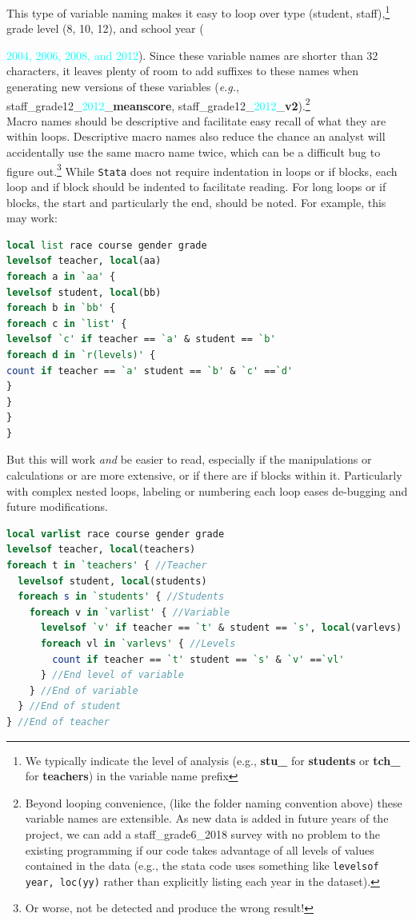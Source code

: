 \documentclass[11pt]{article}
\begin{document}
This type of  variable naming makes it easy to loop over type ({\textcolor{uscred}{student}}, {\textcolor{uscgold}{staff}}),\footnote{We typically indicate the level of analysis (e.g., \textcolor{uscred}{\textbf{stu\_}} for \textcolor{uscred}{\textbf{students}} or \textcolor{uscgold}{\textbf{tch\_}} for \textcolor{uscgold}{\textbf{teachers}}) in the variable name prefix} grade level (8, 10, 12), and school year ({\textcolor{cyan}{2004, 2006, 2008, and 2012}).  Since these variable names are shorter than 32 characters, it leaves plenty of room to add suffixes to these names when generating new versions of these variables (\textit{e.g.}, {\textcolor{uscgold}{\textsf{staff}}}\_grade12\_{\textcolor{cyan}{2012}}\_\textbf{meanscore},  {\textcolor{uscgold}{\textsf{staff}}}\_grade12\_{\textcolor{cyan}{2012}}\_\textbf{v2}).\footnote{Beyond looping convenience, (like the folder naming convention above) these variable names are extensible. As new data is added in future years of the project, we can add a staff\_grade6\_2018 survey with no problem to the existing programming if our code takes advantage of all levels of values contained in the data (e.g., the stata code uses something like \texttt{levelsof year, loc(yy)} rather than explicitly listing each year in the dataset).} \\

Macro names should be descriptive and facilitate easy recall of what they are within loops. Descriptive macro names also reduce the chance an analyst will accidentally use the same macro name twice, which can be a difficult bug to figure out.\footnote{Or worse, not be detected and produce the wrong result!} While \texttt{Stata} does not require indentation in loops or if blocks, each loop and if block should be indented to facilitate reading. For long loops or if blocks, the start and particularly the end, should be noted. For example, this may work:
\begin{lstlisting}[language=Stata, numbers=none]
local list race course gender grade
levelsof teacher, local(aa)
foreach a in `aa' {
levelsof student, local(bb)
foreach b in `bb' {
foreach c in `list' {
levelsof `c' if teacher == `a' & student == `b'
foreach d in `r(levels)' {
count if teacher == `a' student == `b' & `c' ==`d'
}
}
}
}
\end{lstlisting}
But this will work \emph{and} be easier to read, especially if the manipulations or calculations or are more extensive, or if there are if blocks within it. Particularly with complex nested loops, labeling or numbering each loop eases de-bugging and future modifications.
\begin{lstlisting}[language=Stata, numbers=none]
local varlist race course gender grade
levelsof teacher, local(teachers)
foreach t in `teachers' { //Teacher
  levelsof student, local(students)
  foreach s in `students' { //Students
    foreach v in `varlist' { //Variable
      levelsof `v' if teacher == `t' & student == `s', local(varlevs)
      foreach vl in `varlevs' { //Levels
        count if teacher == `t' student == `s' & `v' ==`vl'
      } //End level of variable
    } //End of variable
  } //End of student
} //End of teacher
\end{lstlisting}

}
\end{document}

